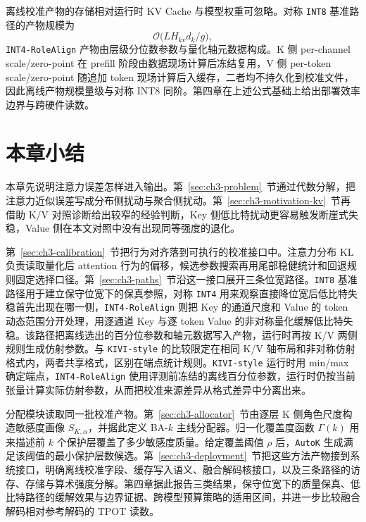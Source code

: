 离线校准产物的存储相对运行时 KV Cache 与模型权重可忽略。对称 \texttt{INT8} 基准路径的产物规模为
\begin{equation}
\mathcal O\!\bigl(L H_{kv} d_k/g\bigr),
\end{equation}
\texttt{INT4-RoleAlign} 产物由层级分位数参数与量化轴元数据构成。K 侧 per-channel scale/zero-point 在 prefill 阶段由数据现场计算后冻结复用，V 侧 per-token scale/zero-point 随追加 token 现场计算后入缓存，二者均不持久化到校准文件，因此离线产物规模量级与对称 INT8 同阶。第四章在上述公式基础上给出部署效率边界与跨硬件读数。

\section{本章小结}
\label{sec:ch3-summary}

本章先说明注意力误差怎样进入输出。第~\ref{sec:ch3-problem}~节通过代数分解，把注意力近似误差写成分布侧扰动与聚合侧扰动。第~\ref{sec:ch3-motivation-kv}~节再借助 K/V 对照诊断给出较窄的经验判断，Key 侧低比特扰动更容易触发断崖式失稳，Value 侧在本文对照中没有出现同等强度的退化。

第~\ref{sec:ch3-calibration}~节把行为对齐落到可执行的校准接口中。注意力分布 KL 负责读取量化后 attention 行为的偏移，候选参数搜索再用尾部稳健统计和回退规则固定选择口径。第~\ref{sec:ch3-paths}~节沿这一接口展开三条位宽路径。\texttt{INT8} 基准路径用于建立保守位宽下的保真参照，对称 \texttt{INT4} 用来观察直接降位宽后低比特失稳首先出现在哪一侧，\texttt{INT4-RoleAlign} 则把 Key 的通道尺度和 Value 的 token 动态范围分开处理，用逐通道 Key 与逐 token Value 的非对称量化缓解低比特失稳。该路径把离线选出的百分位参数和轴元数据写入产物，运行时再按 K/V 两侧规则生成仿射参数。与 \texttt{KIVI-style} 的比较限定在相同 K/V 轴布局和非对称仿射格式内，两者共享格式，区别在端点统计规则。\texttt{KIVI-style} 运行时用 min/max 确定端点，\texttt{INT4-RoleAlign} 使用评测前冻结的离线百分位参数，运行时仍按当前张量计算实际仿射参数，从而把校准来源差异从格式差异中分离出来。

分配模块读取同一批校准产物。第~\ref{sec:ch3-allocator}~节由逐层 K 侧角色尺度构造敏感度画像 $S_{K,\alpha}$，并据此定义 BA-$k$ 主线分配器。归一化覆盖度函数 $\Gamma(k)$ 用来描述前 $k$ 个保护层覆盖了多少敏感度质量。给定覆盖阈值 $\rho$ 后，\texttt{AutoK} 生成满足该阈值的最小保护层数候选。第~\ref{sec:ch3-deployment}~节把这些方法产物接到系统接口，明确离线校准字段、缓存写入语义、融合解码核接口，以及三条路径的访存、存储与算术强度分解。第四章据此报告三类结果，保守位宽下的质量保真、低比特路径的缓解效果与边界证据、跨模型预算策略的适用区间，并进一步比较融合解码相对参考解码的 TPOT 读数。
